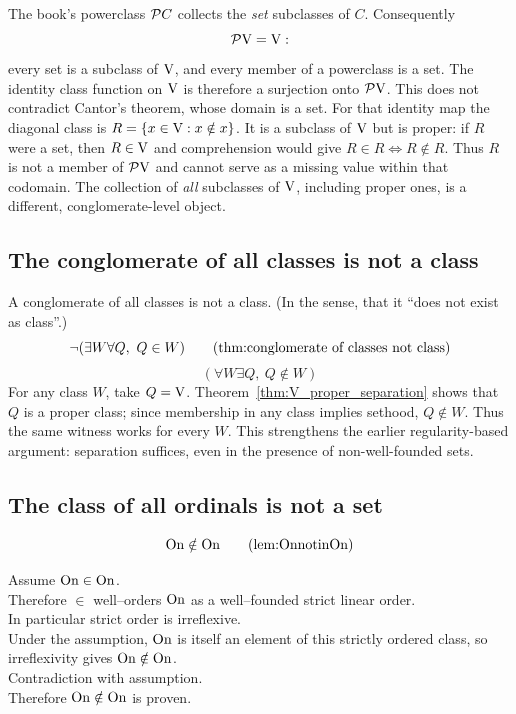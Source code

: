 \begin{remark}
The book's powerclass $\mathcal{P} C$ collects the \emph{set} subclasses
of $C$. Consequently
\[
\mathcal{P}\mathrm{V}=\mathrm{V}:
\]
every set is a subclass of $\mathrm{V}$, and every member of a powerclass is
a set. The identity class function on $\mathrm{V}$ is therefore a surjection
onto $\mathcal{P}\mathrm{V}$. This does not contradict Cantor's theorem, whose
domain is a set. For that identity map the diagonal class is
$R=\{x\in\mathrm{V}:x\notin x\}$. It is a subclass of $\mathrm{V}$ but is proper:
if $R$ were a set, then $R\in\mathrm{V}$ and comprehension would give
$R\in R\iff R\notin R$. Thus $R$ is not a member of
$\mathcal{P}\mathrm{V}$ and cannot serve as a missing value within that codomain.
The collection of \emph{all} subclasses of $\mathrm{V}$, including proper
ones, is a different, conglomerate-level object.
\end{remark}

\subsection{The conglomerate of all classes is not a class}
\begin{theorem}
A conglomerate of all classes is not a class. (In the sense, that it ``does not exist as class''.)
\[
\neg (\exists W \forall Q,\ Q\in W)
\labeltagd{thm}{conglomerate of classes not class}
\]
\[
(\forall W \exists Q,\ Q\notin W)
\]
\Proof
For any class $W$, take $Q=\mathrm{V}$. Theorem~\ref{thm:V_proper_separation}
shows that $Q$ is a proper class; since membership in any class implies
sethood, $Q\notin W$. Thus the same witness works for every $W$.
This strengthens the earlier regularity-based argument: separation
suffices, even in the presence of non-well-founded sets.
\Done
\end{theorem}

\subsection{The class of all ordinals is not a set}

\begin{lemma}[On is not in On]
\[
\On\notin\On
\labeltagd{lem}{OnnotinOn}
\]
\end{lemma}%
\Proof
Assume $\mathrm{On}\in\mathrm{On}$.\\
Therefore $\in$ well--orders $\mathrm{On}$ as a well--founded strict linear order.\\
In particular strict order is irreflexive.\\
Under the assumption, $\mathrm{On}$ is itself an element of this strictly ordered
class, so irreflexivity gives $\mathrm{On}\notin\mathrm{On}$.\\
Contradiction with assumption.\\
Therefore $\mathrm{On}\notin\mathrm{On}$ is proven.
\Done

